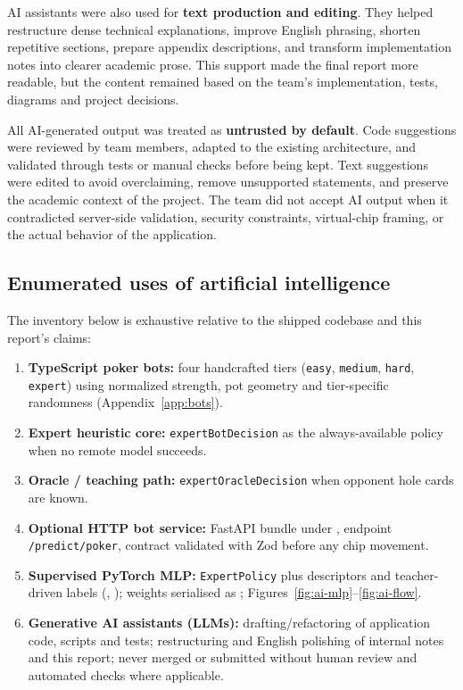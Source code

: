 \documentclass[11pt,a4paper]{article}
\begin{document}
AI assistants were also used for \textbf{text production and editing}. They helped restructure dense technical explanations, improve English phrasing, shorten repetitive sections, prepare appendix descriptions, and transform implementation notes into clearer academic prose. This support made the final report more readable, but the content remained based on the team's implementation, tests, diagrams and project decisions.

All AI-generated output was treated as \textbf{untrusted by default}. Code suggestions were reviewed by team members, adapted to the existing architecture, and validated through tests or manual checks before being kept. Text suggestions were edited to avoid overclaiming, remove unsupported statements, and preserve the academic context of the project. The team did not accept AI output when it contradicted server-side validation, security constraints, virtual-chip framing, or the actual behavior of the application.

\subsection{Enumerated uses of artificial intelligence}

The inventory below is exhaustive relative to the shipped codebase and this report's claims:

\begin{enumerate}
\item \textbf{TypeScript poker bots:} four handcrafted tiers (\texttt{easy}, \texttt{medium}, \texttt{hard}, \texttt{expert}) using normalized strength, pot geometry and tier-specific randomness (Appendix~\ref{app:bots}).
\item \textbf{Expert heuristic core:} \texttt{expertBotDecision} as the always-available policy when no remote model succeeds.
\item \textbf{Oracle / teaching path:} \texttt{expertOracleDecision} when opponent hole cards are known.
\item \textbf{Optional HTTP bot service:} FastAPI bundle under , endpoint \texttt{/predict/poker}, contract validated with Zod before any chip movement.
\item \textbf{Supervised PyTorch MLP:} \texttt{ExpertPolicy} plus  descriptors and teacher-driven labels (, ); weights serialised as ; Figures~\ref{fig:ai-mlp}--\ref{fig:ai-flow}.
\item \textbf{Generative AI assistants (LLMs):} drafting/refactoring of application code, scripts and tests; restructuring and English polishing of internal notes and this report; never merged or submitted without human review and automated checks where applicable.
\end{enumerate}
\end{document}
